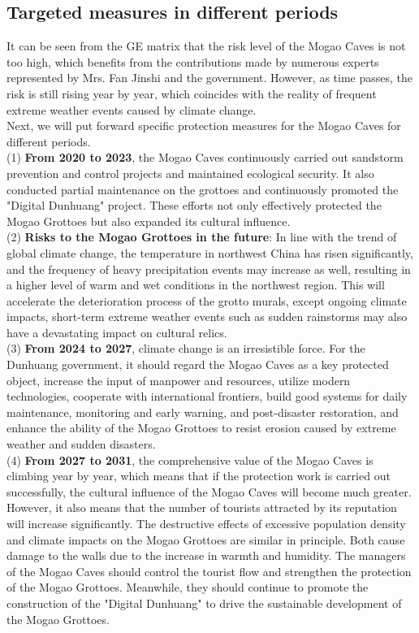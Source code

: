 \documentclass[12pt]{article}
\begin{document}
\subsection{Targeted measures in different periods}
\hspace{2em}It can be seen from the GE matrix that the risk level of the Mogao Caves is not too high, which benefits from the contributions made by numerous experts represented by Mrs. Fan Jinshi and the government. However, as time passes, the risk is still rising year by year, which coincides with the reality of frequent extreme weather events caused by climate change.\\
\hspace{2em}Next, we will put forward specific protection measures for the Mogao Caves for different periods.\\
(1) \textbf{From 2020 to 2023}, the Mogao Caves continuously carried out sandstorm prevention and control projects and maintained ecological security. It also conducted partial maintenance on the grottoes and continuously promoted the "Digital Dunhuang" project. These efforts not only effectively protected the Mogao Grottoes but also expanded its cultural influence.\\
(2) \textbf{Risks to the Mogao Grottoes in the future}: In line with the trend of global climate change, the temperature in northwest China has risen significantly, and the frequency of heavy precipitation events may increase as well, resulting in a higher level of warm and wet conditions in the northwest region. This will accelerate the deterioration process of the grotto murals, except ongoing climate impacts, short-term extreme weather events such as sudden rainstorms may also have a devastating impact on cultural relics.\\
(3) \textbf{From 2024 to 2027}, climate change is an irresistible force. For the Dunhuang government, it should regard the Mogao Caves as a key protected object, increase the input of manpower and resources, utilize modern technologies, cooperate with international frontiers, build good systems for daily maintenance, monitoring and early warning, and post-disaster restoration, and enhance the ability of the Mogao Grottoes to resist erosion caused by extreme weather and sudden disasters.\\
(4) \textbf{From 2027 to 2031}, the comprehensive value of the Mogao Caves is climbing year by year, which means that if the protection work is carried out successfully, the cultural influence of the Mogao Caves will become much greater. However, it also means that the number of tourists attracted by its reputation will increase significantly. The destructive effects of excessive population density and climate impacts on the Mogao Grottoes are similar in principle. Both cause damage to the walls due to the increase in warmth and humidity. The managers of the Mogao Caves should control the tourist flow and strengthen the protection of the Mogao Grottoes. Meanwhile, they should continue to promote the construction of the "Digital Dunhuang" to drive the sustainable development of the Mogao Grottoes. 



\end{document}
